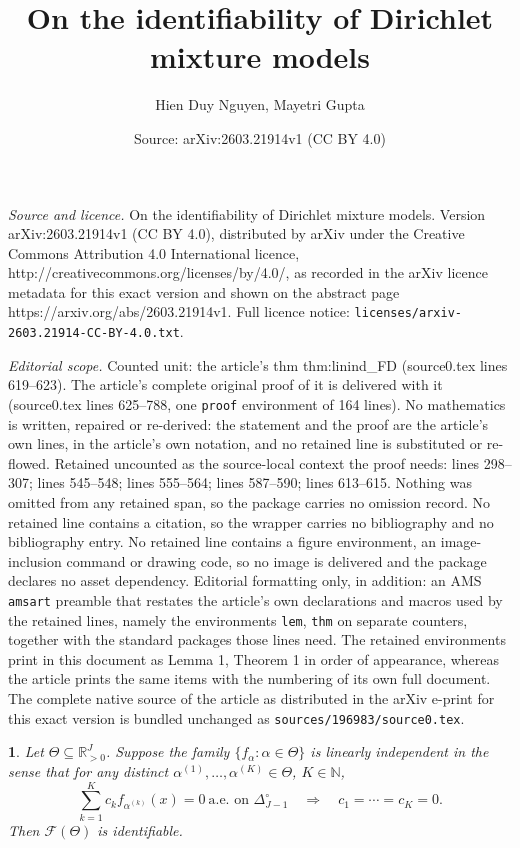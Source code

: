 \documentclass[10pt,a4paper]{amsart}
\title{On the identifiability of Dirichlet mixture models}
\author{Hien Duy Nguyen, Mayetri Gupta}
\date{Source: arXiv:2603.21914v1 (CC BY 4.0)}
\newtheorem{lem}{}
\begin{document}
\maketitle

\noindent\emph{Source and licence.} On the identifiability of Dirichlet mixture models. Version arXiv:2603.21914v1 (CC BY 4.0), distributed by arXiv under the Creative Commons Attribution 4.0 International licence, http://creativecommons.org/licenses/by/4.0/, as recorded in the arXiv licence metadata for this exact version and shown on the abstract page https://arxiv.org/abs/2603.21914v1. Full licence notice: \texttt{licenses/arxiv-2603.21914-CC-BY-4.0.txt}.\par\smallskip

\noindent\textit{Editorial scope.} Counted unit: the article's thm thm:linind\_FD (source0.tex lines 619--623). The article's complete original proof of it is delivered with it (source0.tex lines 625--788, one \texttt{proof} environment of 164 lines). No mathematics is written, repaired or re-derived: the statement and the proof are the article's own lines, in the article's own notation, and no retained line is substituted or re-flowed.  Retained uncounted as the source-local context the proof needs: lines 298--307; lines 545--548; lines 555--564; lines 587--590; lines 613--615.  Nothing was omitted from any retained span, so the package carries no omission record.  No retained line contains a citation, so the wrapper carries no bibliography and no bibliography entry.  No retained line contains a figure environment, an image-inclusion command or drawing code, so no image is delivered and the package declares no asset dependency.  Editorial formatting only, in addition: an AMS \texttt{amsart} preamble that restates the article's own declarations and macros used by the retained lines, namely the environments \texttt{lem}, \texttt{thm} on separate counters, together with the standard packages those lines need.  The retained environments print in this document as Lemma 1, Theorem 1 in order of appearance, whereas the article prints the same items with the numbering of its own full document.  The complete native source of the article as distributed in the arXiv e-print for this exact version is bundled unchanged as \texttt{sources/196983/source0.tex}.
\begin{lem}
\label{lem:linind_ident} Let $\Theta\subseteq\mathbb{R}_{>0}^{J}$.
Suppose the family $\{f_{\alpha}:\alpha\in\Theta\}$ is linearly independent
in the sense that for any distinct $\alpha^{(1)},\dots,\alpha^{(K)}\in\Theta$,
$K\in\mathbb{N}$, 
\[
\sum_{k=1}^{K}c_{k}f_{\alpha^{(k)}}(x)=0\ \text{a.e. on }\Delta_{J-1}^{\circ}\quad\Longrightarrow\quad c_{1}=\cdots=c_{K}=0.
\]
Then $\mathcal{F}\left(\Theta\right)$ is identifiable. 
\end{lem}
\end{document}
